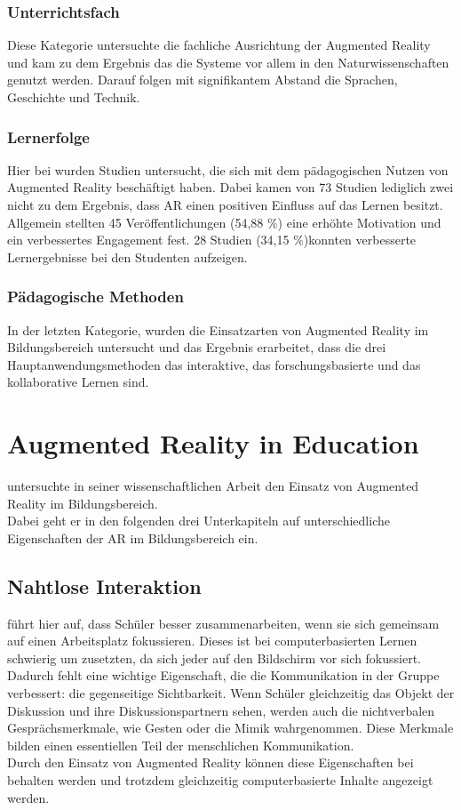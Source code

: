 \subsubsection{Unterrichtsfach}
Diese Kategorie untersuchte die fachliche Ausrichtung der Augmented Reality und kam zu dem Ergebnis das die Systeme vor allem in den Naturwissenschaften genutzt werden. Darauf folgen mit signifikantem Abstand die Sprachen, Geschichte und Technik.

\subsubsection{Lernerfolge}
Hier bei wurden Studien untersucht, die sich mit dem pädagogischen Nutzen von Augmented Reality beschäftigt haben. Dabei kamen von 73 Studien lediglich zwei nicht zu dem Ergebnis, dass AR einen positiven Einfluss auf das Lernen besitzt.\\
Allgemein stellten 45 Veröffentlichungen (54,88 \%) eine erhöhte Motivation und ein verbessertes Engagement fest. 28 Studien (34,15 \%)konnten verbesserte Lernergebnisse bei den Studenten aufzeigen.  

\subsubsection{Pädagogische Methoden}
In der letzten Kategorie, wurden die Einsatzarten von Augmented Reality im Bildungsbereich untersucht und das Ergebnis erarbeitet, dass die drei Hauptanwendungsmethoden das interaktive, das forschungsbasierte und das kollaborative Lernen sind.

\section{Augmented Reality in Education}
\citeauthor{billinghurst:ar-in-education} untersuchte in seiner wissenschaftlichen Arbeit \citep{billinghurst:ar-in-education} den Einsatz von Augmented Reality im Bildungsbereich.\\
Dabei geht er in den folgenden drei Unterkapiteln auf unterschiedliche Eigenschaften der AR im Bildungsbereich ein.
\subsection{Nahtlose Interaktion}
\citeauthor{billinghurst:ar-in-education} führt hier auf, dass Schüler besser zusammenarbeiten, wenn sie sich gemeinsam auf einen Arbeitsplatz fokussieren. Dieses ist bei computerbasierten Lernen schwierig um zusetzten, da sich jeder auf den Bildschirm vor sich fokussiert. Dadurch fehlt eine wichtige Eigenschaft, die die Kommunikation in der Gruppe verbessert: die gegenseitige Sichtbarkeit. Wenn Schüler gleichzeitig das Objekt der Diskussion und ihre Diskussionspartnern sehen, werden auch die nichtverbalen Gesprächsmerkmale, wie Gesten oder die Mimik wahrgenommen. Diese Merkmale bilden einen essentiellen Teil der menschlichen Kommunikation. \\
Durch den Einsatz von Augmented Reality können diese Eigenschaften bei behalten werden und trotzdem gleichzeitig computerbasierte Inhalte angezeigt werden.

